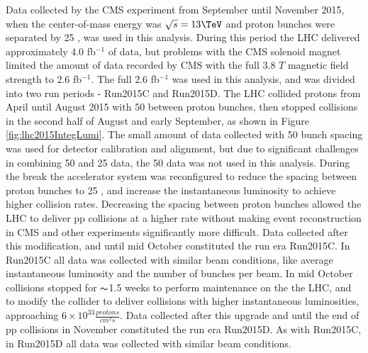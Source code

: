 Data collected by the CMS experiment from September until November 2015, when the center-of-mass energy 
was $\sqrt{s} = 13\TeV$ and proton bunches were separated by 25 \ns, was used in this analysis.  
During this period the LHC delivered approximately 4.0 fb$^{-1}$ \cite{lumi} of data, but problems 
with the CMS solenoid magnet limited the amount of data recorded by CMS with the full 3.8 $\unit{T}$ 
magnetic field strength to 2.6 fb$^{-1}$.  The full 2.6 fb$^{-1}$ was used in this analysis, and was 
divided into two run periods - Run2015C and Run2015D.  The LHC collided protons from April until August 
2015 with 50 \ns between proton bunches, then stopped collisions in the second half of August and 
early September, as shown in Figure \ref{fig:lhc2015IntegLumi}.  The small amount of data collected 
with 50 \ns bunch spacing was used for detector calibration and alignment, but due to significant challenges 
in combining 50 \ns and 25 \ns data, the 50 \ns data was not used in this analysis.  During the break 
the accelerator system was reconfigured to reduce the spacing between proton bunches to 25 \ns, and increase the 
instantaneous luminosity to achieve higher collision rates.  Decreasing the spacing between proton bunches 
allowed the LHC to deliver pp collisions at a higher rate without making event reconstruction in 
CMS and other experiments significantly more difficult.  Data collected after this modification, and until 
mid October constituted the run era Run2015C.  In Run2015C all data was collected with similar beam 
conditions, like average instantaneous luminosity and the number of bunches per beam.  In mid October 
collisions stopped for $\thicksim$1.5 weeks to perform maintenance on the the LHC, and to modify the 
collider to deliver collisions with higher instantaneous luminosities, approaching $6 \times 10^{33} \frac{protons}{cm^{2}s}$.  
Data collected after this upgrade and until the end of pp collisions in November constituted the run 
era Run2015D.  As with Run2015C, in Run2015D all data was collected with similar beam conditions.


